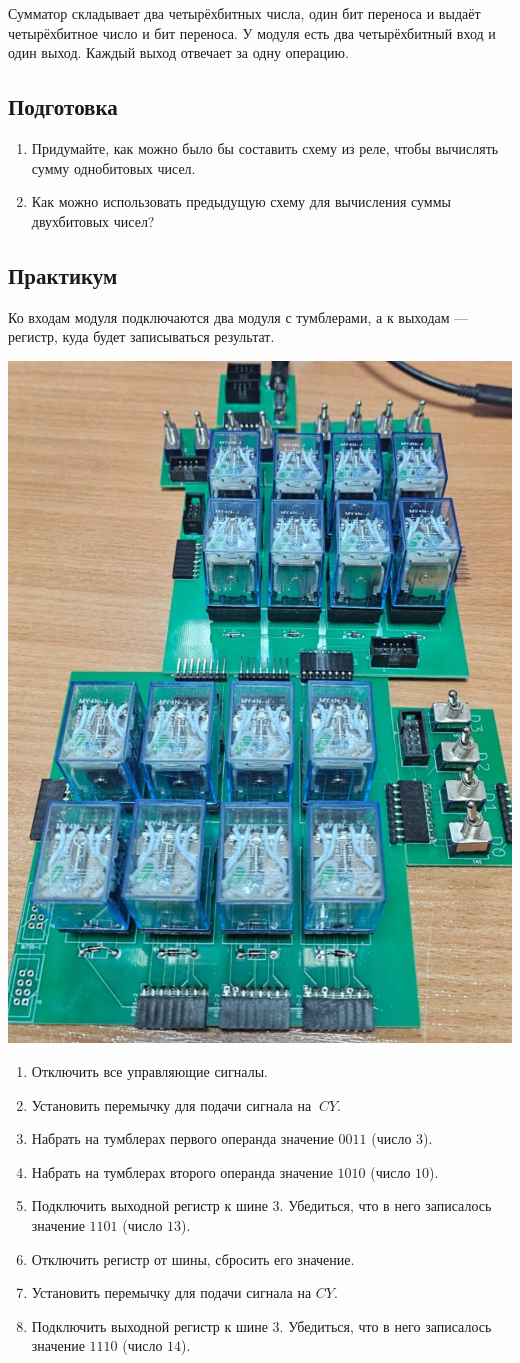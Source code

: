 Сумматор складывает два четырёхбитных числа, один бит переноса и выдаёт четырёхбитное число и бит переноса.
У модуля есть два четырёхбитный вход и один выход.
Каждый выход отвечает за одну операцию.


\subsection{Подготовка}

\begin{enumerate}
    \item Придумайте, как можно было бы составить схему из реле, чтобы вычислять сумму однобитовых чисел.
    \item Как можно использовать предыдущую схему для вычисления суммы двухбитовых чисел?
\end{enumerate}

\subsection{Практикум}

Ко входам модуля подключаются два модуля с тумблерами, а к выходам --- регистр,
куда будет записываться результат.

\includegraphics[width=0.5\columnwidth]{photo/adder.jpg}

\begin{enumerate}
    \item Отключить все управляющие сигналы.
    \item Установить перемычку для подачи сигнала на $~CY$.
    \item Набрать на тумблерах первого операнда значение $0011$ (число $3$).
    \item Набрать на тумблерах второго операнда значение $1010$ (число $10$).
    \item Подключить выходной регистр к шине $3$. Убедиться, что в него записалось значение $1101$ (число $13$).
    \item Отключить регистр от шины, сбросить его значение.
    \item Установить перемычку для подачи сигнала на $CY$.
    \item Подключить выходной регистр к шине $3$. Убедиться, что в него записалось значение $1110$ (число $14$).
\end{enumerate}


